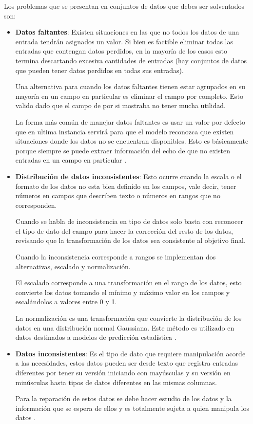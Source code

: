 \documentclass[letter,12pt]{report}
\begin{document}
Los problemas que se presentan en conjuntos de datos que debes ser solventados son:
\begin{itemize}
    \item \textbf{Datos faltantes}: Existen situaciones en las que no todos los datos de una
        entrada tendrán asignados un valor. Si bien es factible eliminar todas las
        entradas que contengan datos perdidos, en la mayoría de los casos esto termina
        descartando excesiva cantidades de entradas (hay conjuntos de datos que pueden
        tener datos perdidos en todas sus entradas).

        Una alternativa para cuando los datos faltantes tienen estar agrupados en su
        mayoría en un campo en particular es eliminar el campo por completo. Esto valido
        dado que el campo de por si mostraba no tener mucha utilidad.

        La forma más común de manejar datos faltantes es usar un valor por defecto que en
        ultima instancia servirá para que el modelo reconozca que existen situaciones
        donde los datos no se encuentran disponibles. Esto es básicamente porque siempre
        se puede extraer información del echo de que no existen entradas en un campo en
        particular \cite{Miss}.
    \item \textbf{Distribución de datos inconsistentes}: Esto ocurre cuando la escala o
        el formato de los datos no esta bien definido en los campos, vale decir, tener
        números en campos que describen texto o números en rangos que no corresponden.

        Cuando se habla de inconsistencia en tipo de datos solo basta con reconocer el
        tipo de dato del campo para hacer la corrección del resto de los datos, revisando
        que la transformación de los datos sea consistente al objetivo final.

        Cuando la inconsistencia corresponde a rangos se implementan dos alternativas,
        escalado y normalización.

        El escalado corresponde a una transformación en el rango de los datos, esto
        convierte los datos tomando el mínimo y máximo valor en los campos y escalándolos
        a valores entre 0 y 1.

        La normalización es una transformación que convierte la distribución de los datos
        en una distribución normal Gaussiana. Este método es utilizado en datos
        destinados a modelos de predicción estadística \cite{Scal}.
    \item \textbf{Datos inconsistentes}: Es el tipo de dato que requiere manipulación
        acorde a las necesidades, estos datos pueden ser desde texto que registra
        entradas diferentes por tener su versión iniciando con mayúsculas y su versión en
        minúsculas hasta tipos de datos diferentes en las mismas columnas.

        Para la reparación de estos datos se debe hacer estudio de los datos y la
        información que se espera de ellos y es totalmente sujeta a quien manipula los
        datos \cite{Ingsoc}.
\end{itemize}
\end{document}
